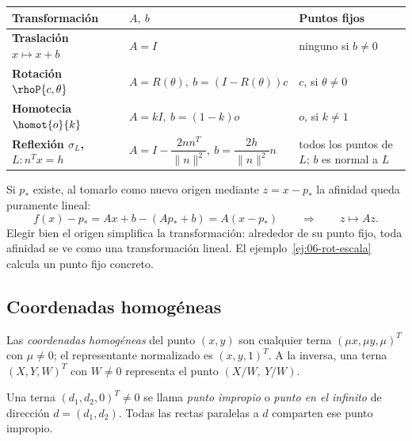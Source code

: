 \begin{center}
\begin{tabularx}{\textwidth}{>{\bfseries}l l X}
\toprule
Transformación & \(A,\ b\) & Puntos fijos\\
\midrule
Traslación \(x\mapsto x+b\) & \(A=I\) & ninguno si \(b\neq0\)\\
Rotación \(\rhoP{c,\theta}\) & \(A=R(\theta),\ b=(I-R(\theta))c\) & \(c\), si \(\theta\neq0\)\\
Homotecia \(\homot{o}{k}\) & \(A=kI,\ b=(1-k)o\) & \(o\), si \(k\neq1\)\\
Reflexión \(\sigma_L\), \(L\colon n^Tx=h\) &
\(A=I-\dfrac{2nn^T}{\lVert n\rVert^2},\
b=\dfrac{2h}{\lVert n\rVert^2}n\) &
todos los puntos de \(L\); \(b\) es normal a \(L\)\\
\bottomrule
\end{tabularx}
\end{center}

Si \(p_\ast\) existe, al tomarlo como nuevo origen mediante \(z=x-p_\ast\) la afinidad queda
puramente lineal:
\[
  f(x)-p_\ast=Ax+b-(Ap_\ast+b)=A(x-p_\ast)
  \qquad\Longrightarrow\qquad
  z\mapsto Az .
\]
Elegir bien el origen simplifica la transformación: alrededor de su punto fijo, toda afinidad
se ve como una transformación lineal. El ejemplo~\ref{ej:06-rot-escala} calcula un punto
fijo concreto.

\subsection{Coordenadas homogéneas}\label{sec:homogeneas}

\begin{definicion}\label{def:06-homogeneas}
Las \emph{coordenadas homogéneas} del punto \((x,y)\) son cualquier terna
\((\mu x,\mu y,\mu)^T\) con \(\mu\neq0\); el representante normalizado es \((x,y,1)^T\). A la
inversa, una terna \((X,Y,W)^T\) con \(W\neq0\) representa el punto \((X/W,\ Y/W)\).
\end{definicion}

\begin{definicion}\label{def:06-impropio}
Una terna \((d_1,d_2,0)^T\neq0\) se llama \emph{punto impropio} o \emph{punto en el infinito}
de dirección \(d=(d_1,d_2)\). Todas las rectas paralelas a \(d\) comparten ese punto impropio.
\end{definicion}

